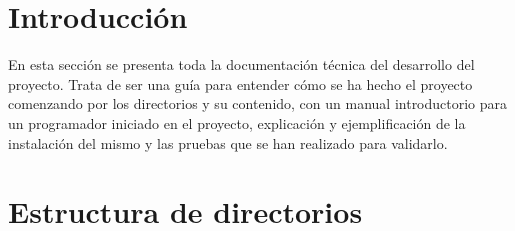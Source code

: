 
\section{Introducción}
En esta sección se presenta toda la documentación técnica del desarrollo del
proyecto. Trata de ser una guía para entender cómo se ha hecho el proyecto
comenzando por los directorios y su contenido, con un manual introductorio para
un programador iniciado en el proyecto, explicación y ejemplificación de la
instalación del mismo y las pruebas que se han realizado para validarlo.

\clearpage
\section{Estructura de directorios}

